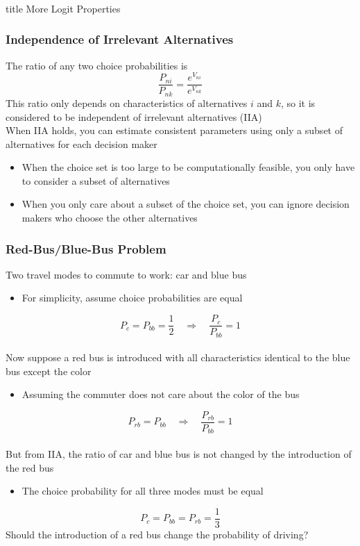 \documentclass{beamer}\usepackage[]{graphicx}\usepackage[]{color}
\begin{document}
\begin{frame}\frametitle{}
    \vfill
    \centering
    \begin{beamercolorbox}[center]{title}
        \Large More Logit Properties
    \end{beamercolorbox}
    \vfill
\end{frame}

\begin{frame}\frametitle{Independence of Irrelevant Alternatives}
    The ratio of any two choice probabilities is
    $$\frac{P_{ni}}{P_{nk}} = \frac{e^{V_{ni}}}{e^{V_{nk}}}$$
    This ratio only depends on characteristics of alternatives $i$ and $k$, so it is considered to be independent of irrelevant alternatives (IIA) \\
    \vspace{3ex}
    When IIA holds, you can estimate consistent parameters using only a subset of alternatives for each decision maker
    \begin{itemize}
    	\item When the choice set is too large to be computationally feasible, you only have to consider a subset of alternatives
    	\item When you only care about a subset of the choice set, you can ignore decision makers who choose the other alternatives
    \end{itemize}
\end{frame}

\begin{frame}\frametitle{Red-Bus/Blue-Bus Problem}
    Two travel modes to commute to work: car and blue bus
    \begin{itemize}
    	\item For simplicity, assume choice probabilities are equal
    \end{itemize}
    $$P_c = P_{bb} = \frac{1}{2} \quad \Rightarrow \quad \frac{P_c}{P_{bb}} = 1$$ \\
    Now suppose a red bus is introduced with all characteristics identical to the blue bus except the color
    \begin{itemize}
    	\item Assuming the commuter does not care about the color of the bus
    \end{itemize}
    $$P_{rb} = P_{bb} \quad \Rightarrow \quad \frac{P_{rb}}{P_{bb}} = 1$$ \\
    But from IIA, the ratio of car and blue bus is not changed by the introduction of the red bus
    \begin{itemize}
    	\item The choice probability for all three modes must be equal
    \end{itemize}
    $$P_c = P_{bb} = P_{rb} = \frac{1}{3}$$
    Should the introduction of a red bus change the probability of driving?
\end{frame}
\end{document}

